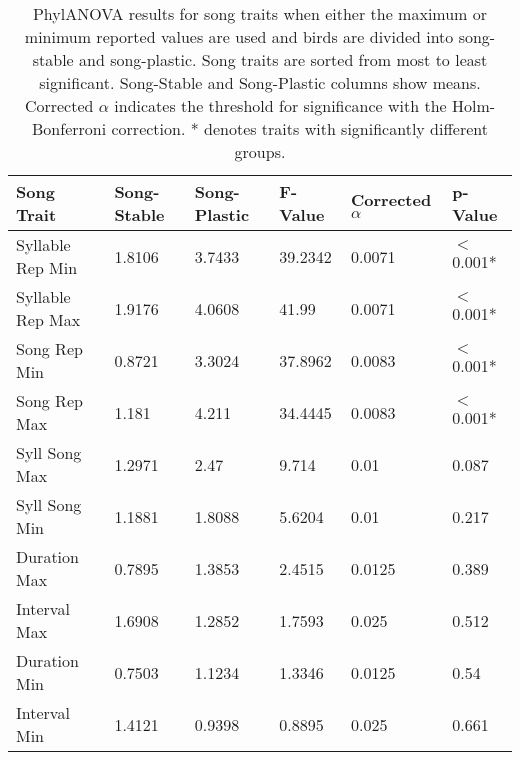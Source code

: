 \documentclass[a4paper,12pt]{article}
\begin{document}
\newcommand{\beginsupplement}{%
        \setcounter{table}{0}
        \renewcommand{\thetable}{S\arabic{table}}%
        \setcounter{figure}{0}
        \renewcommand{\thefigure}{S\arabic{figure}}%
     }

\beginsupplement
\setcounter{page}{16}





\begin{table}[ht]
\caption{PhylANOVA results for song traits when either the maximum or minimum reported values are used and birds are divided into song-stable and song-plastic. Song traits are sorted from most to least significant. Song-Stable and Song-Plastic columns show means. Corrected $\alpha$ indicates the threshold for significance with the Holm-Bonferroni correction. * denotes traits with significantly different groups.}
\centering
\begin{tabular}{llllll}
  \hline
Song Trait & Song-Stable & Song-Plastic & F-Value & Corrected $\alpha$ & p-Value \\ 
  \hline
Syllable Rep Min & 1.8106 & 3.7433 & 39.2342 & 0.0071 & $<$0.001* \\ 
  Syllable Rep Max & 1.9176 & 4.0608 & 41.99 & 0.0071 & $<$0.001* \\ 
  Song Rep Min & 0.8721 & 3.3024 & 37.8962 & 0.0083 & $<$0.001* \\ 
  Song Rep Max & 1.181 & 4.211 & 34.4445 & 0.0083 & $<$0.001* \\ 
  Syll Song Max & 1.2971 & 2.47 & 9.714 & 0.01 & 0.087 \\ 
  Syll Song Min & 1.1881 & 1.8088 & 5.6204 & 0.01 & 0.217 \\ 
  Duration Max & 0.7895 & 1.3853 & 2.4515 & 0.0125 & 0.389 \\ 
  Interval Max & 1.6908 & 1.2852 & 1.7593 & 0.025 & 0.512 \\ 
  Duration Min & 0.7503 & 1.1234 & 1.3346 & 0.0125 & 0.54 \\ 
  Interval Min & 1.4121 & 0.9398 & 0.8895 & 0.025 & 0.661 \\ 
   \hline
\end{tabular}
\end{table}
\end{document}
